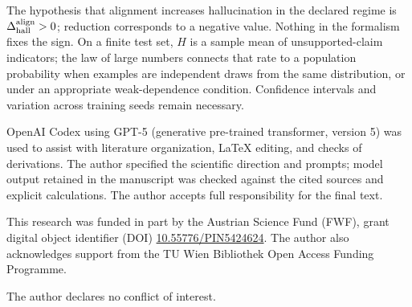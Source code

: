 \documentclass[
  aps,
  reprint,
  superscriptaddress,
  floatfix,
  nofootinbib,
  longbibliography
]{revtex4-2}
\begin{document}
The hypothesis that alignment increases hallucination in the declared regime
is $\Delta_{\rm hall}^{\rm align}>0$; reduction corresponds to a negative
value.  Nothing in the formalism fixes the sign.  On a finite test set, $H$ is
a sample mean of unsupported-claim indicators; the law of large numbers
connects that rate to a population probability when examples are independent
draws from the same distribution, or under an appropriate weak-dependence
condition.  Confidence intervals and variation across training seeds remain
necessary.

\begin{acknowledgments}
OpenAI Codex using GPT-5 (generative pre-trained transformer, version 5) was
used to assist with literature organization, \LaTeX{}
editing, and checks of derivations.  The author specified the scientific
direction and prompts; model output retained in the manuscript was checked
against the cited sources and explicit calculations.  The author accepts full
responsibility for the final text.

This research was funded in part by the Austrian Science Fund (FWF), grant
digital object identifier (DOI)
\href{https://doi.org/10.55776/PIN5424624}{10.55776/PIN5424624}.
The author also acknowledges support from the TU Wien Bibliothek Open Access
Funding Programme.

The author declares no conflict of interest.
\end{acknowledgments}




\end{document}

